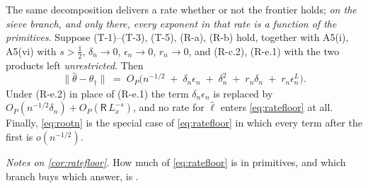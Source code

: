 \begin{corollary}\label{cor:ratefloor}
The same decomposition delivers a rate whether or not the frontier holds; \emph{on the sieve branch, and
only there, every exponent in that rate is a function of the primitives}.
Suppose (T-1)--(T-3), (T-5), (R-a), (R-b) hold, together with A5(i), A5(vi) with $s>\tfrac12$,
$\delta_n\to0$, $\epsilon_n\to0$, $r_n\to0$, and (R-c.2), (R-e.1) with the two products left
\emph{unrestricted}. Then
\begin{equation}\label{eq:ratefloor}
\big\|\hat\theta-\theta_\dagger\big\|
\;=\;O_P\Big(n^{-1/2}\;+\;\delta_n\epsilon_n\;+\;\delta_n^{2}\;+\;r_n\delta_n\;+\;r_n\epsilon^{L}_n\Big).
\end{equation}
Under (R-e.2) in place of (R-e.1) the term $\delta_n\epsilon_n$ is replaced by
$O_P(n^{-1/2}\delta_n)+O_P(\mathsf R\,L_x^{-s})$, and no rate for $\hat\ell$ enters
\eqref{eq:ratefloor} at all. Finally, \eqref{eq:rootn} is the special case of \eqref{eq:ratefloor} in
which every term after the first is $o(n^{-1/2})$.
\end{corollary}

\noindent\emph{Notes on \cref{cor:ratefloor}.} How much of \eqref{eq:ratefloor} is in primitives, and
which branch buys which answer, is .
